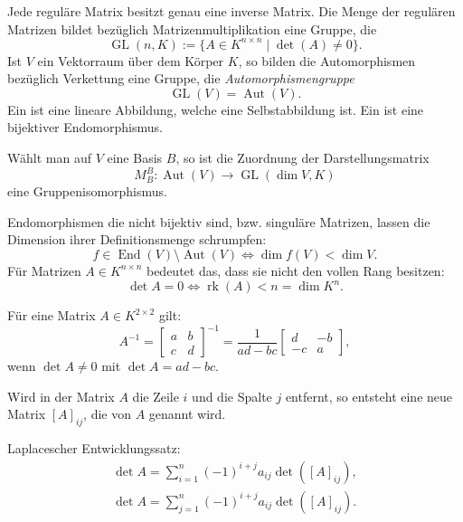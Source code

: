 \noindent
{}
Jede reguläre Matrix besitzt genau eine inverse Matrix. 
Die Menge der regulären Matrizen bildet bezüglich Matrizenmultiplikation
eine Gruppe, die
\begin{equation}
\operatorname{GL}(n,K) := \{A\in K^{n\times n}\mid\det(A)\ne 0\}.
\end{equation}
Ist $V$ ein Vektorraum über dem Körper $K$, so bilden die
Automorphismen bezüglich Verkettung eine Gruppe, die
\emph{Automorphismengruppe}
\begin{equation}
\operatorname{GL}(V) = \operatorname{Aut}(V).
\end{equation}
Ein 
ist eine lineare Abbildung, welche eine Selbstabbildung ist.
Ein 
ist eine bijektiver Endomorphismus.

Wählt man auf $V$ eine Basis
$B$, so ist die Zuordnung der Darstellungsmatrix
\begin{equation}
M_B^B\colon \operatorname{Aut}(V)\to\operatorname{GL}(\dim V,K)
\end{equation}
eine Gruppenisomorphismus.

Endomorphismen die nicht bijektiv sind, bzw. singuläre Matrizen,
lassen die Dimension ihrer Definitionsmenge schrumpfen:
\begin{equation}
f{\in}\operatorname{End}(V){\setminus}\operatorname{Aut}(V)
\Longleftrightarrow \dim f(V)<\dim V.
\end{equation}
Für Matrizen $A\in K^{n\times n}$ bedeutet das, dass sie nicht
den vollen Rang besitzen:
\begin{equation}
\det A=0\iff \operatorname{rk}(A) < n = \dim K^n.
\end{equation}

Für eine Matrix $A\in K^{2\times 2}$ gilt:
\begin{equation}
A^{-1} = \begin{bmatrix}
a & b\\
c & d
\end{bmatrix}^{-1}
= \frac{1}{ad-bc}\begin{bmatrix}
d & -b\\
-c & a
\end{bmatrix},
\end{equation}
wenn $\det A\ne 0$ mit $\det A = ad-bc$.

\begin{definition}[Streichungsmatrix]\mbox{}\newline
Wird in der Matrix $A$ die Zeile $i$ und die Spalte $j$ entfernt,
so entsteht eine neue Matrix $[A]_{ij}$, die
von $A$ genannt wird.
\end{definition}
Laplacescher Entwicklungssatz:
\begin{align}
\det A = \sum_{i=1}^n (-1)^{i+j}a_{ij}\det([A]_{ij}),\\
\det A = \sum_{j=1}^n (-1)^{i+j}a_{ij}\det([A]_{ij}).
\end{align}

